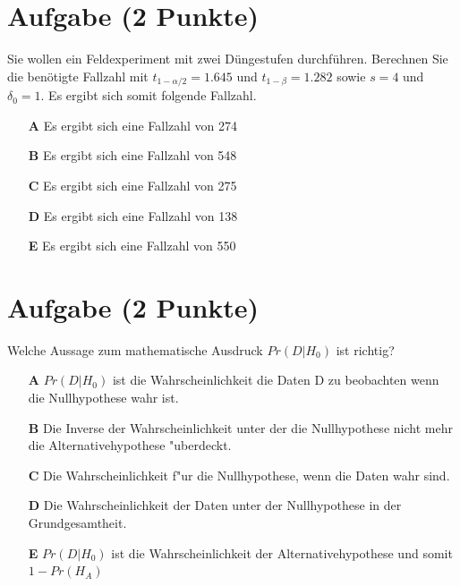 \documentclass[a4paper, 10pt]{scrartcl}\usepackage[]{graphicx}\usepackage[]{color}
\begin{document}
\section{Aufgabe \hfill (2 Punkte)}




Sie wollen ein Feldexperiment mit zwei D{\"u}ngestufen durchf{\"u}hren. Berechnen
Sie die ben{\"o}tigte Fallzahl mit $t_{1-\alpha/2} = 1.645$ und
$t_{1-\beta} = 1.282$ sowie $s = 4$ und
$\delta_0 = 1$. Es ergibt sich somit folgende Fallzahl.



\begin{enumerate}
\item [\textbf{A} \msquare] Es ergibt sich eine Fallzahl von 274
\item [\textbf{B} \msquare] Es ergibt sich eine Fallzahl von 548
\item [\textbf{C} \msquare] Es ergibt sich eine Fallzahl von 275
\item [\textbf{D} \msquare] Es ergibt sich eine Fallzahl von 138
\item [\textbf{E} \msquare] Es ergibt sich eine Fallzahl von 550
\end{enumerate}

\section{Aufgabe \hfill (2 Punkte)}

Welche Aussage zum mathematische Ausdruck $Pr(D|H_0)$ ist richtig? 



\begin{enumerate}
\item [\textbf{A} \msquare] $Pr(D|H_0)$ ist die Wahrscheinlichkeit die Daten D zu beobachten wenn die Nullhypothese wahr ist.
\item [\textbf{B} \msquare] Die Inverse der Wahrscheinlichkeit unter der die Nullhypothese nicht mehr die Alternativehypothese {"u}berdeckt.
\item [\textbf{C} \msquare] Die Wahrscheinlichkeit f{"u}r die Nullhypothese, wenn die Daten wahr sind.
\item [\textbf{D} \msquare] Die Wahrscheinlichkeit der Daten unter der Nullhypothese in der Grundgesamtheit.
\item [\textbf{E} \msquare] $Pr(D|H_0)$ ist die Wahrscheinlichkeit der Alternativehypothese und somit $1 - Pr(H_A)$
\end{enumerate}
\end{document}
